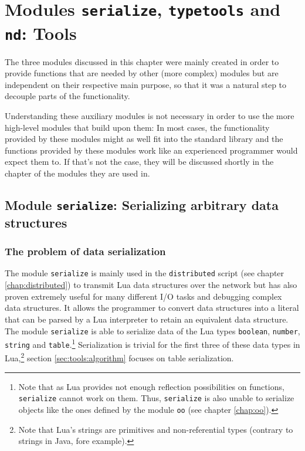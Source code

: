\chapter{Modules \texttt{serialize}, \texttt{typetools} and \texttt{nd}: Tools}
\label{chap:serialize}
\label{chap:typetools}
\label{chap:nd}

The three modules discussed in this chapter were mainly created in order to provide functions that are needed by other (more complex) modules but are independent on their respective main purpose, so that it was a natural step to decouple parts of the functionality.

Understanding these auxiliary modules is not necessary in order to use the more high-level modules that build upon them: In most cases, the functionality provided by these modules might as well fit into the standard library and the functions provided by these modules work like an experienced programmer would expect them to. If that's not the case, they will be discussed shortly in the chapter of the modules they are used in.

\section{Module \texttt{serialize}: Serializing arbitrary data structures}

\subsection{The problem of data serialization}
\label{sec:tools:serialize:problem}

The module \texttt{serialize} is mainly used in the \texttt{distributed} script (see chapter \ref{chap:distributed}) to transmit Lua data structures over the network but has also proven extremely useful for many different I/O tasks and debugging complex data structures. It allows the programmer to convert data structures into a literal that can be parsed by a Lua interpreter to retain an equivalent data structure. The module \texttt{serialize} is able to serialize data of the Lua types \texttt{boolean}, \texttt{number}, \texttt{string} and \texttt{table}.\footnote{Note that as Lua provides not enough reflection possibilities on functions, \texttt{serialize} cannot work on them. Thus, \texttt{serialize} is also unable to serialize objects like the ones defined by the module \texttt{oo} (see chapter \ref{chap:oo}).} Serialization is trivial for the first three of these data types in Lua,\footnote{Note that Lua's strings are primitives and non-referential types (contrary to strings in Java, fore example).} section \ref{sec:tools:algorithm} focuses on table serialization.

